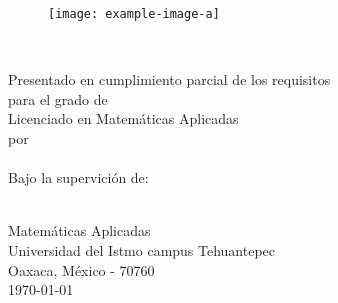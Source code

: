\thispagestyle{empty}
\vspace*{0.50cm}
\begin{center}
	\begin{figure}[t]
		\centering
		\texttt{[image: example-image-a]}
	\end{figure}
 {\LARGE  {\thesistitle}\\}

\vspace*{1.50cm}
{ Presentado en cumplimiento parcial de los requisitos
\\
para el grado de
}\\

\vspace*{1.0cm}
{\Large {Licenciado en Matemáticas Aplicadas}}\\

\vspace*{0.5cm}
{por}\\

\vspace*{0.5cm}
{\Large{\authorname}}\\

\vspace*{1cm}
{ Bajo la supervición de:}\\

\vspace*{0.3cm}
{\large{ \supervisorname}}\\

\vspace*{0.50cm}


\vspace*{0.50cm}
{ Matemáticas Aplicadas\\
Universidad del Istmo campus Tehuantepec\\
Oaxaca, México - 70760\\
\today} \\%
\vspace{1.8cm}

\end{center}

\clearpage

\thispagestyle{plain}
\clearpage

